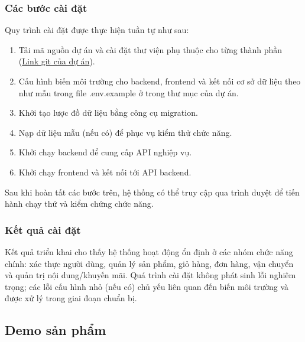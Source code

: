 \documentclass[13pt]{article}
\begin{document}
\subsubsection{Các bước cài đặt}
Quy trình cài đặt được thực hiện tuần tự như sau:
\begin{enumerate}
    \item Tải mã nguồn dự án và cài đặt thư viện phụ thuộc cho từng thành phần (\href{https://github.com/themanhhhh/project2_hust.git}{Link git của dự án}).
    \item Cấu hình biến môi trường cho backend, frontend và kết nối cơ sở dữ liệu theo như mẫu trong file .env.example ở trong thư mục của dự án.
    \item Khởi tạo lược đồ dữ liệu bằng công cụ migration.
    \item Nạp dữ liệu mẫu (nếu có) để phục vụ kiểm thử chức năng.
    \item Khởi chạy backend để cung cấp API nghiệp vụ.
    \item Khởi chạy frontend và kết nối tới API backend.
\end{enumerate}
Sau khi hoàn tất các bước trên, hệ thống có thể truy cập qua trình duyệt để tiến hành chạy thử và kiểm chứng chức năng.

\subsubsection{Kết quả cài đặt}
Kết quả triển khai cho thấy hệ thống hoạt động ổn định ở các nhóm chức năng chính: xác thực người dùng, quản lý sản phẩm, giỏ hàng, đơn hàng, vận chuyển và quản trị nội dung/khuyến mãi. 
Quá trình cài đặt không phát sinh lỗi nghiêm trọng; các lỗi cấu hình nhỏ (nếu có) chủ yếu liên quan đến biến môi trường và được xử lý trong giai đoạn chuẩn bị.

\subsection{Demo sản phẩm}
\end{document}
